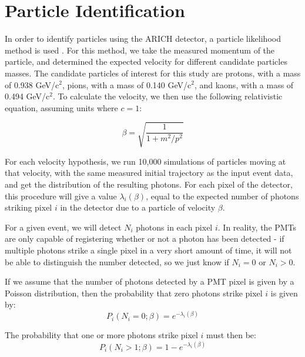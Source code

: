 
\chapter{Particle Identification}
\label{ch:Results}
In order to identify particles using the \ac{ARICH} detector, a particle likelihood method is used \cite{richImpact, belleArich}.
For this method, we take the measured momentum of the particle, and determined the expected velocity for different candidate particles masses.
The candidate particles of interest for this study are protons, with a mass of 0.938 GeV/c$^2$, pions, with a mass of 0.140 GeV/c$^2$, and kaons, with a mass of 0.494 GeV/c$^2$.
To calculate the velocity, we then use the following relativistic equation, assuming units where $c = 1$:

\begin{equation}
\label{eq:relMass}
 \beta = \sqrt{\frac{1}{1 +m^2 / p^2}}
\end{equation}


For each velocity hypothesis, we run 10,000 simulations of particles moving at that velocity, with the same measured initial trajectory as the input event data, and get the distribution of the resulting photons.
For each pixel of the detector, this procedure will give a value $\lambda_i(\beta)$, equal to the expected number of photons striking pixel $i$ in the detector due to a particle of velocity $\beta$. 

For a given event, we will detect $N_i$ photons in each pixel $i$.
In reality, the PMTs are only capable of registering whether or not a photon has been detected - if multiple photons strike a single pixel in a very short amount of time, it will not be able to distinguish the number detected, so we just know if $N_i = 0$ or $N_i > 0$.

If we assume that the number of photons detected by a PMT pixel is given by a Poisson distribution, then the probability that zero photons strike pixel $i$ is given by:
\begin{equation}
P_i(N_i=0; \beta) = e^{-\lambda_i(\beta)}
\end{equation}

 The probability that one or more photons strike pixel $i$ must then be:
\begin{equation}
P_i(N_i>1; \beta) = 1 - e^{-\lambda_i(\beta)}
\end{equation}

